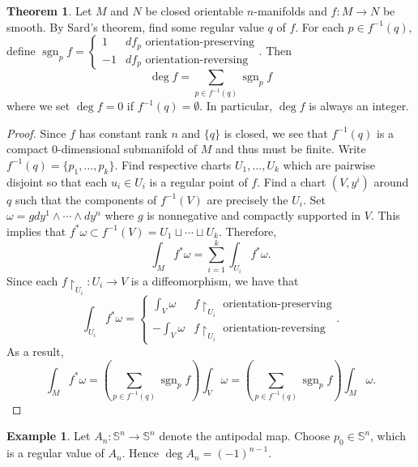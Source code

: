 \documentclass[10pt,letterpaper,cm]{nupset}
\theoremstyle{definition}
\newtheorem{exmp}[definition]{Example}
\theoremstyle{theorem}
\newtheorem{theorem}[definition]{Theorem}
\theoremstyle{remark}
\renewcommand{\S}{\mathbb S}
\newcommand{\1}{\mathbf{1}}
\newcommand{\0}{\vec 0}
\DeclareMathOperator{\sgn}{sgn}
\begin{document}
\begin{theorem}
Let $M$ and $N$ be closed orientable $n$-manifolds and $f: M \to N$ be smooth. By Sard's theorem, find some regular value $q$ of $f$. For each $p\in f^{-1}(q)$, define 
$ \sgn_pf = \begin{cases}
1 & df_p \text{ orientation-preserving} 
\\ -1  & df_p \text{ orientation-reversing} \end{cases}. $  Then $$\deg f = \sum_{p\in f^{-1}(q)} \sgn_pf$$ where we set $\deg f = 0$ if $f^{-1}(q) = \emptyset$.
In particular, $\deg f$ is always an integer. 
\end{theorem}
\begin{proof}
Since $f$ has constant rank $n$ and $\{q\}$ is closed, we see that $f^{-1}(q)$ is a compact $0$-dimensional submanifold  of $M$ and thus must be finite. Write $f^{-1}(q) = \{p_1, \ldots, p_k\}$. Find respective charts $U_1, \ldots, U_k$ which are pairwise disjoint so that each $u_i \in U_i$ is a regular point of $f$. Find a chart $(V, y^i)$ around $q$ such that the components of $f^{-1}(V)$ are precisely the $U_i$. Set $\omega = gdy^1 \wedge \cdots \wedge dy^n$ where $g$ is nonnegative and compactly supported in $V$. This implies that $f^{\ast}\omega \subset f^{-1}(V) =U_1 \sqcup \cdots \sqcup U_k$. Therefore, $$  \int_Mf^{\ast}\omega =\sum_{i=1}^k\int_{U_i}f^{\ast}\omega .$$ Since each $f\restriction_{U_i} : U_i \to V$ is a diffeomorphism, we have that $$ \int_{U_i}f^{\ast}\omega =
\begin{cases}
\int_{V} \omega & f\restriction_{U_i}  \text{ orientation-preserving} 
\\ -\int_V\omega  & f\restriction_{U_i} \text{ orientation-reversing}
\end{cases} .$$ As a result, $$\int_M f^{\ast} \omega  =\left(\sum_{p\in f^{-1}(q)} \sgn_pf \right)\int_V \omega =\left(\sum_{p\in f^{-1}(q)} \sgn_pf \right)\int_M \omega .$$
\end{proof}

\begin{exmp}
Let $A_n: \S^n \to \S^n$ denote the antipodal map. Choose $p_0 \in \S^n$, which is a regular value of $A_n$. Hence $\deg A_n = (-1)^{n-1}$.
\end{exmp}
\end{document}
